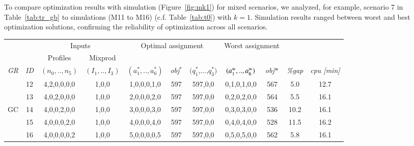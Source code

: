 \documentclass[review,12pt, 3p, times]{elsarticle}
\begin{document}
To compare optimization results with simulation (Figure~\ref{fig:mk1})  for mixed scenarios, we analyzed, for example, scenario 7 in Table~\ref{tab:tr_gb} to simulations (M11 to M16) (c.f. Table~\ref{tab:t0}) with $k=1$. Simulation results ranged between  worst and best optimization solutions, confirming the reliability of optimization across all scenarios.
	
\begin{longtable}{|c|c|c|c|c|c|c|c|c|c|c|}
	\hline
	& & \multicolumn{2}{c|}{Inputs} & \multicolumn{3}{c|}{Optimal assignment} & \multicolumn{2}{c|}{Worst assignment }& \multicolumn{2}{c|}{}\\
	&  & Profiles & Mixprod & \multicolumn{3}{c|}{} & \multicolumn{2}{c|}{} & \multicolumn{2}{c|}{}\\
    \it{GR} & \it{ID} & \multicolumn{1}{c|}{$(n_0,..,n_5)$} & \multicolumn{1}{c|}{$(I_1,..,I_3)$} & {$(a^*_1,..,a^*_6)$} & \it{obj}$^*$ & $(q^*_1$,...,$q^*_3)$ & {$(a^{\textsc{w}}_1,..,a^{\textsc{w}}_6)$} & \it{obj}$^{\textsc{w}}$ & \it{\%gap}   & \it{ cpu [min]} \\				
	\hline
	        & 12      & 4,2,0,0,0,0                         & 1,0,0                                & 1,0,0,0,1,0          & 597          & 597,0,0               & 0,1,0,1,0,0                                & 567                     & 5.0    &  12.7   \\
	        & 13      & 4,0,2,0,0,0                         & 1,0,0                                & 2,0,0,0,2,0          & 597          & 597,0,0               & 0,2,0,2,0,0                                & 564                     & 5.5   &  16.1     \\
	GC      & 14      & 4,0,0,2,0,0                         & 1,0,0                                & 3,0,0,0,3,0          & 597          & 597,0,0               & 0,3,0,3,0,0                                & 536                     & 10.2     &  16.1   \\
	        & 15      & 4,0,0,0,2,0                         & 1,0,0                                & 4,0,0,0,4,0          & 597          & 597,0,0               & 0,4,0,4,0,0                                & 528                     & 11.5   &  16.2     \\
	        & 16      & 4,0,0,0,0,2                         & 1,0,0                                & 5,0,0,0,0,5          & 597          & 597,0,0               & 0,5,0,5,0,0                                & 562                     & 5.8     &  16.1    \\

\end{longtable}
\end{document}

